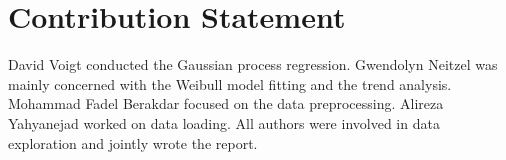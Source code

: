 \documentclass{article}
\theoremstyle{plain}
\theoremstyle{definition}
\theoremstyle{remark}
\begin{document}
\section*{Contribution Statement}
David Voigt conducted the Gaussian process regression. 
Gwendolyn Neitzel was mainly concerned with the Weibull model fitting and the trend analysis.
Mohammad Fadel Berakdar focused on the data preprocessing. Alireza Yahyanejad worked on data loading.
All authors were involved in data exploration and jointly wrote the report. 


\pagebreak



\end{document}
